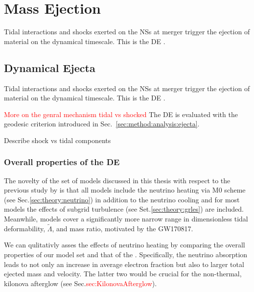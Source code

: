 \documentclass[11pt,a4paper,headinclude=true,DIV=14,BCOR=8mm,chapterprefix,listof=totoc,twoside,openright,abstracton]{scrbook}
\newcommand{\red}[1]{\textcolor{red}{#1}}
\newcommand{\GW}{GW170817}
\newcommand{\eg}{\textit{e.g.}}
\begin{document}
\section{Mass Ejection}


Tidal interactions and shocks exerted on the \acp{NS} at merger trigger the ejection of material
on the dynamical timescale. This is the \ac{DE} \citep[\eg][]{Hotokezaka:2013b,Bauswein:2013yna,Radice:2016dwd,Radice:2018pdn}. 



\subsection{Dynamical Ejecta}


Tidal interactions and shocks exerted on the \acp{NS} at merger trigger the ejection of material
on the dynamical timescale. This is the \ac{DE} \citep[\eg][]{Hotokezaka:2013b,Bauswein:2013yna,Radice:2016dwd,Radice:2018pdn}. 

\red{More on the genral mechanism tidal vs shocked}
The \ac{DE} is evaluated with the geodesic criterion introduced in Sec.~\ref{sec:method:analysis:ejecta}.

Describe shock vs tidal components 

\subsubsection{Overall properties of the \ac{DE}}


The novelty of the set of models discussed in this thesis with respect to the 
previous study by \citet{Radice:2018pdn} is that all models include the neutrino heating via M0 scheme 
(see Sec.\ref{sec:theory:neutrino}) in addition to the neutrino cooling and for most models the effects 
of subgrid turbulence (see Set.\ref{sec:theory:grles}) are included.
Meanwhile, models cover a significantly more narrow range in 
dimensionless tidal deformability, $\tilde{\Lambda}$, and mass ratio, motivated by the \GW{}.

We can qulitativly asses the effects of neutrino heating by comparing the overall properties 
of our model set and that of the \citet{Radice:2018pdn}.
Specifically, the neutrino absorption leads to not only an increase in average electron 
fraction but also to larger total ejected mass and velocity. The latter two would be 
crucial for the non-thermal, kilonova afterglow (see Sec.\red{sec:KilonovaAfterglow}).
\end{document}
